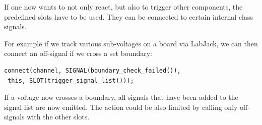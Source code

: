\documentclass[10pt,a4paper]{article}
\begin{document}
If one now wants to not only react, but also to trigger other components, the predefined slots have to be used. They can be connected to certain internal class signals. 

For example if we track various sub-voltages on a board via LabJack, we can then connect an off-signal if we cross a set boundary:

\begin{lstlisting}[caption=PSU.cpp]
connect(channel, SIGNAL(boundary_check_failed()),
 this, SLOT(trigger_signal_list()));
\end{lstlisting}

If a voltage now crosses a boundary, all signals that have been added to the signal list are now emitted. The action could be also limited by calling only off-signals with the other slots.
\end{document}
